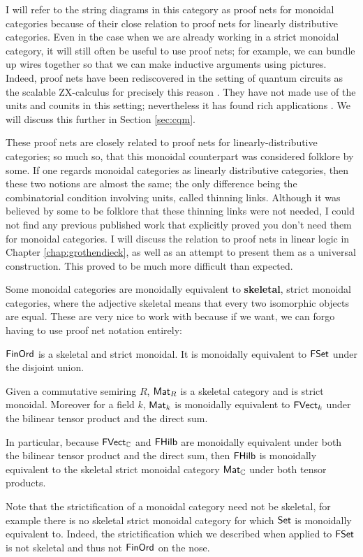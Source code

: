I will refer to the string diagrams in this category as proof nets for monoidal categories because of their close relation to proof nets for linearly distributive categories.  Even in the case when we are already working in a strict monoidal category, it will still often be useful to use proof nets; for example, we can bundle up wires together so that we can make inductive arguments using pictures.  Indeed, proof nets have been rediscovered in the setting of quantum circuits as the scalable ZX-calculus for precisely this reason \cite{szx}.  They have not made use of the units and counits in this setting; nevertheless it has found rich applications \cite{szxi,szxii}.  We will discuss this further in Section \ref{sec:cqm}.
\begin{aside}
These proof nets are closely related to proof nets for linearly-distributive categories; so much so, that this monoidal counterpart was considered folklore by some.  If one regards monoidal categories as linearly distributive categories, then these two notions are almost the same; the only difference being the combinatorial condition involving units, called thinning links.  Although it was believed by some to be folklore that these thinning links were not needed, I could not find any previous published  work that explicitly proved you don't need them for monoidal categories.  I will discuss the relation to proof nets in linear logic in Chapter \ref{chap:grothendieck}, as well as an attempt to present them as a universal construction.  This proved to be much more difficult than expected.
\end{aside}
Some monoidal categories are monoidally equivalent to {\bf skeletal}, strict monoidal categories, where the adjective skeletal means that every two isomorphic objects are equal.  These are very nice to work with because if we want, we can forgo having to use proof net notation entirely:
\begin{example}
$\mathsf{FinOrd}$ is a skeletal and strict monoidal. It is monoidally equivalent to $\mathsf{FSet}$ under the disjoint union.


Given a commutative semiring $R$, $\mathsf{Mat}_R$ is a skeletal category and is strict monoidal. Moreover for a field $k$, $\mathsf{Mat}_k$ is monoidally equivalent to $\mathsf{FVect}_k$ under the bilinear tensor product and the direct sum.

In particular, because $\mathsf{FVect}_{\mathbb{C}}$ and $\mathsf{FHilb}$ are monoidally equivalent under both the bilinear tensor product and the direct sum, then $\mathsf{FHilb}$ is monoidally equivalent to the skeletal strict monoidal category $\mathsf{Mat}_{\mathbb{C}}$ under both tensor products.
\end{example}
Note that the strictification of a monoidal category need not be skeletal, for example there is no skeletal strict monoidal  category for which $\mathsf{Set}$ is monoidally equivalent to.  Indeed, the strictification which we described when applied to $\mathsf{FSet}$ is not skeletal and thus not $\mathsf{FinOrd}$ on the nose.


